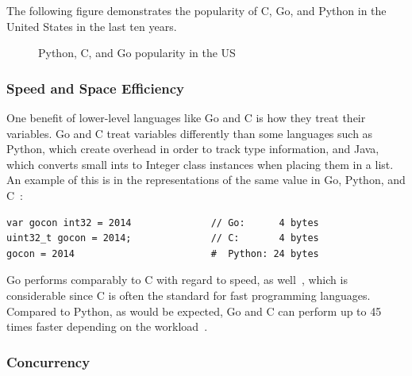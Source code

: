 \documentclass[10pt,letterpaper,onecolumn,draftclsnofoot]{IEEEtran}
\begin{document}
The following figure demonstrates the popularity of C, Go, and Python in the
United States in the last ten years.

\begin{figure}[H]
	\begin{center}
		\caption{Python, C, and Go popularity in the US~\cite{PYPL}}
	\end{center}
\end{figure}

\subsubsection{Speed and Space Efficiency}

One benefit of lower-level languages like Go and C is how they treat their
variables. Go and C treat variables differently than some languages such as
Python, which create overhead in order to track type information, and Java,
which converts small ints to Integer class instances when placing them in a
list. An example of this is in the representations of the same value in Go,
Python, and C~\cite{davecheney}:

\begin{lstlisting}
var gocon int32 = 2014              // Go:      4 bytes
uint32_t gocon = 2014;              // C:       4 bytes
gocon = 2014                        #  Python: 24 bytes
\end{lstlisting}

Go performs comparably to C with regard to speed, as well~\cite{benchmarks},
which is considerable since C is often the standard for fast programming
languages. Compared to Python, as would be expected, Go and C can perform up to
45 times faster depending on the workload~\cite{benchmarks}.

\subsubsection{Concurrency}
\end{document}
